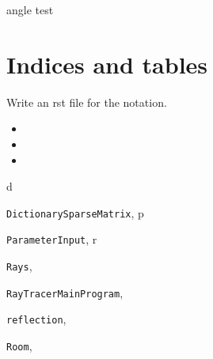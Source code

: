 \documentclass[letterpaper,10pt,english]{sphinxmanual}
\begin{document}
\begin{fulllineitems}
\label{index:reflection.test3}
angle test

\end{fulllineitems}



\chapter{Indices and tables}
\label{index:indices-and-tables}
Write an rst file for the notation.
\begin{itemize}
\item {} 

\item {} 

\item {} 

\end{itemize}


\renewcommand{\indexname}{Python Module Index}
\begin{theindex}
\def\bigletter#1{{\Large\sffamily#1}\nopagebreak\vspace{1mm}}
\bigletter{d}
\item {\texttt{DictionarySparseMatrix}}, \pageref{index:module-DictionarySparseMatrix}
\indexspace
\bigletter{p}
\item {\texttt{ParameterInput}}, \pageref{index:module-ParameterInput}
\indexspace
\bigletter{r}
\item {\texttt{Rays}}, \pageref{index:module-Rays}
\item {\texttt{RayTracerMainProgram}}, \pageref{index:module-RayTracerMainProgram}
\item {\texttt{reflection}}, \pageref{index:module-reflection}
\item {\texttt{Room}}, \pageref{index:module-Room}
\end{theindex}

\renewcommand{\indexname}{Index}
\printindex
\end{document}
